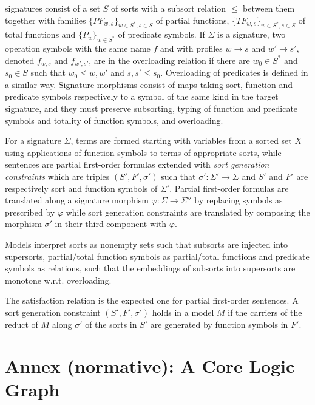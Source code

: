 \documentclass[10pt,fleqn,%
\ifpretendfinal
final%
\else
draft%
\fi,
]{scrreprt}
\newcommand{\normannex}[1]{ \chapter{Annex (normative): #1} }
\begin{document}
\CASL signatures consist of a set $S$ of sorts with a subsort relation $\leq$ between them
together with
families $\{PF_{w,s}\}_{w\in S^*, s\in S}$ of partial functions,
$\{TF_{w,s}\}_{w\in S^*, s\in S}$ of total functions and
$\{P_w\}_{w\in S^*}$ of predicate symbols. 
If $\Sigma$ is a signature, 
two operation symbols with the same name $f$ and with profiles
$w\rightarrow s$ and $w'\rightarrow s'$, denoted $f_{w,s}$ and $f_{w',s'}$, are in the
overloading relation if there are $w_0\in S^*$ and $s_0\in S$ such
that $w_0\leq w, w'$ and $s,s' \leq s_0$. Overloading of predicates is defined in a similar way.
Signature morphisms consist of maps taking sort, function and predicate symbols
respectively to a symbol of the same kind in the target signature, and they 
must preserve subsorting, typing of function and predicate symbols and totality of function symbols,
 and overloading. 

For a signature $\Sigma$, terms are formed starting with
variables from a sorted set $X$ using 
applications of function symbols to terms of appropriate sorts, while
sentences are partial first-order formulas extended with
\emph{sort generation constraints} which are triples $(S', F', \sigma')$ such that 
$\sigma':\Sigma'\rightarrow\Sigma$ and $S'$ and $F'$ are respectively sort and function symbols of
$\Sigma'$. 
Partial first-order formulas are translated along a signature morphism 
$\varphi:\Sigma\rightarrow\Sigma''$ by replacing symbols as prescribed by $\varphi$
while sort generation constraints are translated by
composing the morphism $\sigma'$ in their third component with $\varphi$.

Models interpret sorts as nonempty sets such that subsorts are injected into supersorts,
partial/total function symbols as partial/total functions and 
predicate symbols as relations,
 such that the embeddings of subsorts into
supersorts are monotone w.r.t. overloading.

The satisfaction relation is the expected one for partial first-order sentences. A sort generation
constraint $(S', F', \sigma')$ holds in a model $M$ if the carriers of the reduct of $M$ along $\sigma'$ 
of the sorts in $S'$ are generated by function symbols in $F'$.

\normannex{A Core Logic Graph}\label{a:graph}
\end{document}
